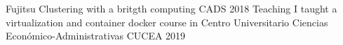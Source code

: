 \begin{cvhonors}
  \cvhonor
    {Fujitsu}
    {Clustering with a britgth computing}
    {CADS}
    {2018}
  \cvhonor
    {Teaching}
    {I taught a virtualization and container docker course in  Centro Universitario Ciencias Económico-Administrativas}
    {CUCEA}
    {2019}
\end{cvhonors}
